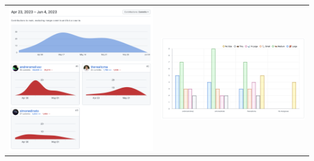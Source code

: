 \documentclass{report}
\begin{document}
\begin{center}
\begin{longtable}{cc}

\includegraphics[width=8cm]{16.png} &
\includegraphics[width=8cm]{17.png} \\

\end{longtable}

\end{center}
\end{document}
